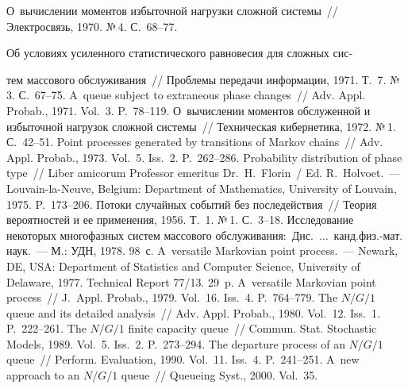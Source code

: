 {\begin{multicols}{2}
{{\begin{thebibliography}{99}
 \vspace*{-2pt}
 
 О~вычислении моментов избыточной нагрузки сложной системы~// 
Электросвязь, 1970. №\,4. С.~68--77.


 Об условиях усиленного статистического 
равновесия для сложных сис-\linebreak\vspace*{-12pt}

\pagebreak

\noindent
тем массового обслуживания~// Проблемы передачи 
информации, 1971. Т.~7. №\,3. С.~67--75.
 A~queue subject to extraneous phase changes~// Adv.
Appl. Probab., 
1971. Vol.~3. P.~78--119.
 О~вычислении моментов обслуженной и избыточной нагрузок сложной 
системы~// Техническая кибернетика, 1972. №\,1. С.~42--51.
 Point processes generated by transitions of Markov chains~// 
Adv. Appl. Probab., 1973. Vol.~5. Iss.~2. P.~262--286.
 Probability distribution of phase type~// 
Liber amicorum Professor emeritus  Dr.\
H.~Florin~/ Ed. R.~Holvoet.~---
Louvain-la-Neuve, Belgium: Department of Mathematics, University of Louvain, 
1975. P.~173--206.
 Потоки случайных событий без последействия~// Теория вероятностей и 
ее применения, 1956. Т.~1. №\,1. С.~3--18. 
 Исследование некоторых многофазных систем массового 
обслуживания:~Дис.~$\ldots$~канд.\linebreak физ.-мат. наук.~--- М.: УДН, 1978. 98~с.
\bibitem{9-n}
 A~versatile Markovian point process.~--- Newark, DE, 
USA: Department of Statistics and Computer Science, University of Delaware, 1977.
 Technical Report 77/13. 29~p.
 A~versatile Markovian point process~// J.~Appl. Probab., 1979. Vol.~16. 
Iss.~4. P.~764--779.
 The $N/G/1$ queue and its detailed analysis~// Adv. Appl. Probab., 
1980. Vol.~12. Iss.~1. P.~222--261.
 The $N/G/1$ finite capacity queue~// Commun. Stat. Stochastic 
Models, 1989. Vol.~5. Iss.~2. P.~273--294. 
 The departure process of an $N/G/1$ queue~// Perform. Evaluation, 1990. 
Vol.~11. Iss.~4. P.~241--251.
 A~new approach to an $N/G/1$ queue~// Queueing Syst., 2000. Vol.~35. 

\end{thebibliography}}}
\end{multicols}}
